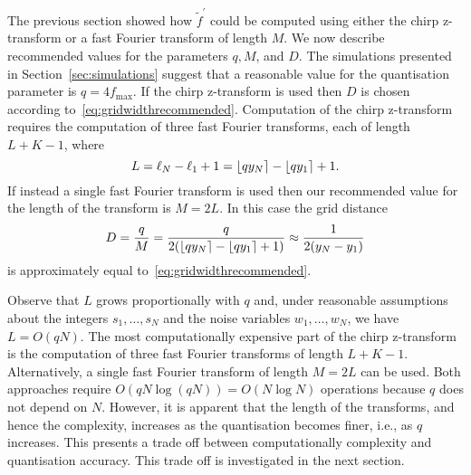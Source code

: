 \documentclass[10pt,twocolumn,twoside]{IEEEtran}
\begin{document}
The previous section showed how $\widetilde{f}^\prime$ could be computed using either the chirp z-transform or a fast Fourier transform of length $M$.  We now describe recommended values for the parameters $q, M$, and $D$.  The simulations presented in Section~\ref{sec:simulations} suggest that a reasonable value for the quantisation parameter is $q = 4 f_{\text{max}}$.  If the chirp z-transform is used then $D$ is chosen according to~\eqref{eq:gridwidthrecommended}.  Computation of the chirp z-transform requires the computation of three fast Fourier transforms, each of length $L + K - 1$, where 
\[
L = \ell_N - \ell_1 + 1 = {\left\lfloor qy_N \right\rceil} - {\left\lfloor qy_1 \right\rceil} + 1.
\]
If instead a single fast Fourier transform is used then our recommended value for the length of the transform is $M= 2L$.  In this case the grid distance
\[ 
D = \frac{q}{M} = \frac{q}{2({\left\lfloor qy_N \right\rceil} - {\left\lfloor qy_1 \right\rceil} + 1)} \approx  \frac{1}{2(y_N - y_1)}
\]
is approximately equal to~\eqref{eq:gridwidthrecommended}.  

Observe that $L$ grows proportionally with $q$ and, under reasonable assumptions about the integers $s_1,\dots,s_N$ and the noise variables $w_1,\dots,w_N$, we have $L = O(qN)$.  The most computationally expensive part of the chirp z-transform is the computation of three fast Fourier transforms of length $L+K-1$.  Alternatively, a single fast Fourier transform of length $M = 2L$ can be used.  Both approaches require $O(qN\log(qN)) = O(N\log N)$ operations because $q$ does not depend on $N$.  However, it is apparent that the length of the transforms, and hence the complexity, increases as the quantisation becomes finer, i.e., as $q$ increases.  This presents a trade off between computationally complexity and quantisation accuracy.  This trade off is investigated in the next section.
\end{document}
